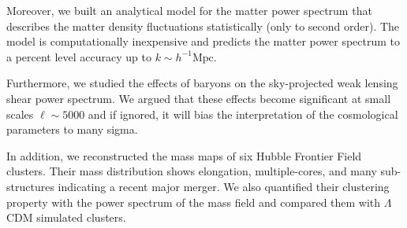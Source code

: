 Moreover, we built an analytical model for the matter power spectrum that
describes the matter density fluctuations statistically (only to second 
order). The model is computationally inexpensive and predicts the
matter power spectrum to a percent level accuracy up to 
$k\sim h^{-1}\mathrm{Mpc}$. 

Furthermore, we studied the effects of baryons on the sky-projected weak lensing
shear power spectrum. We argued that these effects become significant
at small scales $\ell \sim 5000$ and if ignored, it will bias the
interpretation of the cosmological parameters to many sigma.

In addition, we reconstructed the mass maps of six Hubble Frontier Field clusters.
Their mass distribution shows elongation, multiple-cores, and many sub-structures
indicating a recent major merger. We also quantified their clustering 
property with the power spectrum of the mass field and compared them
with $\Lambda$CDM simulated clusters.


